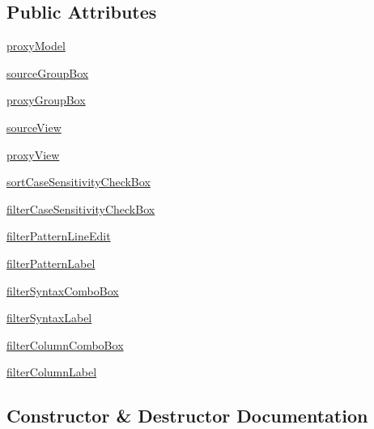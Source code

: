 \subsection*{Public Attributes}
\begin{DoxyCompactItemize}
\item 
\hyperlink{classbasicsortfiltermodel_1_1Window_a17309b8ecc0dda448bdf9f5b128c5a21}{proxy\+Model}
\item 
\hyperlink{classbasicsortfiltermodel_1_1Window_a17100bfc729f757cb541fd4f87a61c34}{source\+Group\+Box}
\item 
\hyperlink{classbasicsortfiltermodel_1_1Window_a3ecfe8fe4fd1b538ebcf69b2cd27650d}{proxy\+Group\+Box}
\item 
\hyperlink{classbasicsortfiltermodel_1_1Window_ac87ebb8c75b2492149fbab135a1c73ff}{source\+View}
\item 
\hyperlink{classbasicsortfiltermodel_1_1Window_aa589d23b7646e38846688d5fd2037a8a}{proxy\+View}
\item 
\hyperlink{classbasicsortfiltermodel_1_1Window_a8e6c890d88c689bf0d992640af605a98}{sort\+Case\+Sensitivity\+Check\+Box}
\item 
\hyperlink{classbasicsortfiltermodel_1_1Window_a5163d949fc333f65565de0b2eaa682e1}{filter\+Case\+Sensitivity\+Check\+Box}
\item 
\hyperlink{classbasicsortfiltermodel_1_1Window_ae1ba1a01b042306a57ec3d659accaa6c}{filter\+Pattern\+Line\+Edit}
\item 
\hyperlink{classbasicsortfiltermodel_1_1Window_aa27f518172e17fe791521801e5090674}{filter\+Pattern\+Label}
\item 
\hyperlink{classbasicsortfiltermodel_1_1Window_ac16a8b3282bff1ae90679b5282190b32}{filter\+Syntax\+Combo\+Box}
\item 
\hyperlink{classbasicsortfiltermodel_1_1Window_a9157291c396df24296be819423f14df5}{filter\+Syntax\+Label}
\item 
\hyperlink{classbasicsortfiltermodel_1_1Window_afea7de49a01c7bdb41505498c398520f}{filter\+Column\+Combo\+Box}
\item 
\hyperlink{classbasicsortfiltermodel_1_1Window_a753dcfd3c02c1ad9726472c9d55c3d20}{filter\+Column\+Label}
\end{DoxyCompactItemize}


\subsection{Constructor \& Destructor Documentation}
\hypertarget{classbasicsortfiltermodel_1_1Window_adf4b43d07c8fed3eae727f27f655ee0a}{}
